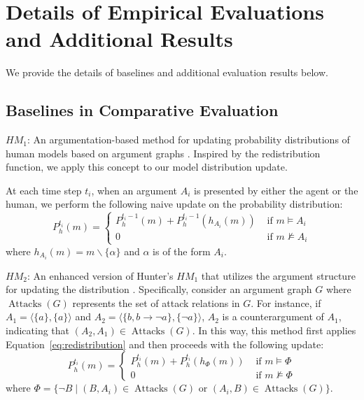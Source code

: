 \section{Details of Empirical Evaluations and Additional Results}

We provide the details of baselines and additional evaluation results below.

\subsection{Baselines in Comparative Evaluation}

\squishlist
\item \textit{$H\!M_1$}: An argumentation-based method for updating probability distributions of human models based on argument graphs \cite{hunter2015modelling}.
Inspired by the redistribution function, we apply this concept to our model distribution update.  

At each time step $t_i$, when an argument $A_i$ is presented by either the agent or the human, we perform the following naive update on the probability distribution: 
    \begin{equation}
	P^{t_i}_{h}(m)= 
	\begin{cases}
		P^{t_i - 1}_{h}(m)+  P^{t_i - 1}_{h}\left(h_{A_i}(m)\right) & \text { if } m \models A_i \\ 
		0 & \text { if } m \not \models A_i
	\end{cases}
	\label{eq:redistribution}
\end{equation}
where $h_{A_i}(m)=m \backslash\{\alpha\}$ and $\alpha$ is of the form $A_i$. 

\item \textit{$H\!M_2$}: An enhanced version of Hunter's $H\!M_1$ that utilizes the argument structure for updating the distribution \cite{hunter2015modelling}. Specifically, consider an argument graph $G$ where $\operatorname{Attacks}(G)$ represents the set of attack relations in $G$. For instance, if $A_1 = \langle \{a\}, \{a\} \rangle$ and $A_2 =  \langle \{b, b \rightarrow \neg a\}, \{\neg a\} \rangle$, $A_2$ is a counterargument of $A_1$, indicating that $(A_2, A_1) \in \operatorname{Attacks}(G)$. In this way, this method first applies Equation~\eqref{eq:redistribution} and then proceeds with the following update:
     \begin{equation}
     P^{t_i}_{h}(m)= 
     \begin{cases}
     P^{t_i}_{h}(m)+  P^{t_i }_{h}\left(h_{\Phi}(m)\right) & \text { if } m \models \Phi \\ 
     0 & \text { if } m \not \models \Phi
     \end{cases}
     \end{equation}
     where $\Phi = \{ \neg B \mid (B, A_i) \in \operatorname{Attacks}(G) \text{ or } (A_i, B) \in \operatorname{Attacks}(G)\}$.
    

